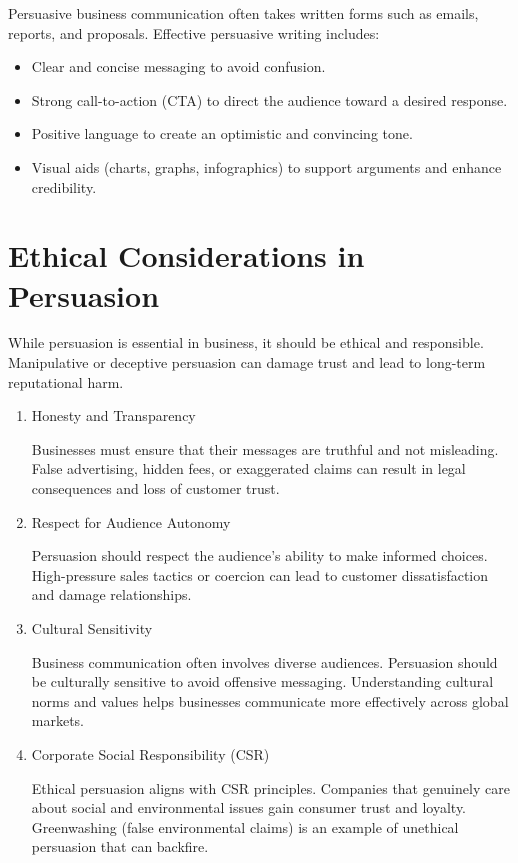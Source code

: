 \documentclass[a4paper]{article}
\begin{document}
\begin{enumerate}
Persuasive business communication often takes written forms such as emails, reports, and proposals. Effective persuasive writing includes:

\begin{itemize}
    \item Clear and concise messaging to avoid confusion.
    \item Strong call-to-action (CTA) to direct the audience toward a desired response.
    \item Positive language to create an optimistic and convincing tone.
    \item Visual aids (charts, graphs, infographics) to support arguments and enhance credibility.
\end{itemize}
\end{enumerate}


\section{Ethical Considerations in Persuasion}

While persuasion is essential in business, it should be ethical and responsible. Manipulative or deceptive persuasion can damage trust and lead to long-term reputational harm.

\begin{enumerate}
\item Honesty and Transparency

Businesses must ensure that their messages are truthful and not misleading. False advertising, hidden fees, or exaggerated claims can result in legal consequences and loss of customer trust.

\item Respect for Audience Autonomy

Persuasion should respect the audience’s ability to make informed choices. High-pressure sales tactics or coercion can lead to customer dissatisfaction and damage relationships.

\item Cultural Sensitivity

Business communication often involves diverse audiences. Persuasion should be culturally sensitive to avoid offensive messaging. Understanding cultural norms and values helps businesses communicate more effectively across global markets.

\item Corporate Social Responsibility (CSR)

Ethical persuasion aligns with CSR principles. Companies that genuinely care about social and environmental issues gain consumer trust and loyalty. Greenwashing (false environmental claims) is an example of unethical persuasion that can backfire.
\end{enumerate}
\end{document}
